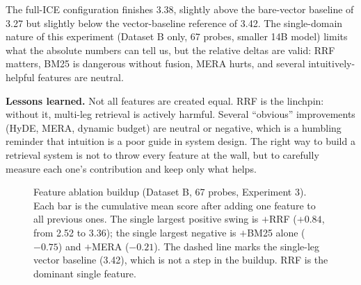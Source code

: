 \documentclass[10pt]{article}
\begin{document}
The full-ICE configuration finishes 3.38, slightly above the bare-vector baseline of 3.27 but slightly below the vector-baseline reference of 3.42. The single-domain nature of this experiment (Dataset B only, 67 probes, smaller 14B model) limits what the absolute numbers can tell us, but the relative deltas are valid: RRF matters, BM25 is dangerous without fusion, MERA hurts, and several intuitively-helpful features are neutral.

\textbf{Lessons learned.} Not all features are created equal. RRF is the linchpin: without it, multi-leg retrieval is actively harmful. Several ``obvious'' improvements (HyDE, MERA, dynamic budget) are neutral or negative, which is a humbling reminder that intuition is a poor guide in system design. The right way to build a retrieval system is not to throw every feature at the wall, but to carefully measure each one's contribution and keep only what helps.

\begin{figure}[t]
\centering
{}
\caption{Feature ablation buildup (Dataset B, 67 probes, Experiment 3). Each bar is the cumulative mean score after adding one feature to all previous ones. The single largest positive swing is $+$RRF ($+0.84$, from 2.52 to 3.36); the single largest negative is $+$BM25 alone ($-0.75$) and $+$MERA ($-0.21$). The dashed line marks the single-leg vector baseline (3.42), which is not a step in the buildup. RRF is the dominant single feature.}
\label{fig:ablation-waterfall}
\end{figure}
\end{document}
